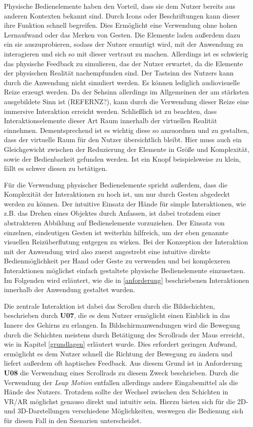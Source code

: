 Physische Bedienelemente haben den Vorteil, dass sie dem Nutzer bereits aus anderen Kontexten bekannt sind. Durch Icons oder Beschriftungen kann dieser ihre Funktion schnell begreifen. 
 Dies Ermöglicht eine Verwendung ohne hohen Lernaufwand oder das Merken von Gesten. 
Die Elemente laden außerdem dazu ein sie auszuprobieren, sodass der Nutzer ermutigt wird, mit der Anwendung zu interagieren und sich so mit dieser vertraut zu machen. 
Allerdings ist es schwierig das physische Feedback zu simulieren, das der Nutzer erwartet, da die Elemente der physischen Realität nachempfunden sind. Der Tastsinn des Nutzers kann durch die Anwendung nicht simuliert werden. Es können lediglich audiovisuelle Reize erzeugt werden. Da der Sehsinn allerdings im Allgemeinen der am stärksten ausgebildete Sinn ist (REFERNZ?), kann durch die Verwendung dieser Reize eine immersive Interaktion erreicht werden. 
Schließlich ist zu beachten, dass Interaktionselemente dieser Art Raum innerhalb der virtuellen Realität einnehmen. Dementsprechend ist es wichtig diese so anzuordnen und zu gestalten, dass der virtuelle Raum für den Nutzer übersichtlich bleibt. Hier muss auch ein Gleichgewicht zwischen der Reduzierung der Elemente in Größe und Komplexität, sowie der Bedienbarkeit gefunden werden. Ist ein Knopf beispielsweise zu klein, fällt es schwer diesen zu betätigen. 

Für die Verwendung physischer Bedienelemente spricht außerdem, dass die Komplexität der Interaktionen zu hoch ist, um nur durch Gesten abgedeckt werden zu können. Der intuitive Einsatz der Hände für simple Interaktionen, wie z.B. das Drehen eines Objektes durch Anfassen, ist dabei trotzdem einer abstrakteren Abbildung auf Bedienelemente vorzuziehen. Der Einsatz von einzelnen, eindeutigen Gesten ist weiterhin hilfreich, um der eben genannte visuellen Reizüberflutung entgegen zu wirken. 
Bei der Konzeption der Interaktion mit der Anwendung wird also zuerst angestrebt eine intuitive direkte Bedienmöglichkeit per Hand oder Geste zu verwenden und bei komplexeren Interaktionen möglichst einfach gestaltete physische Bedienelemente einzusetzen.
Im Folgenden wird erläutert, wie die in \ref{anforderung} beschriebenen Interaktionen innerhalb der Anwendung gestaltet wurden.

Die zentrale Interaktion ist dabei das Scrollen durch die Bildschichten, beschrieben durch \textbf{U07}, die es dem Nutzer ermöglicht einen Einblick in das Innere des Gehirns zu erlangen. In Bildschirmanwendungen wird die Bewegung durch die Schichten meistens durch Betätigung des Scrollrads der Maus erreicht, wie in Kapitel \ref{grundlagen} erläutert wurde.
Dies erfordert geringen Aufwand, ermöglicht es dem Nutzer schnell die Richtung der Bewegung zu ändern und liefert außerdem oft haptisches Feedback. 
Aus diesem Grund ist in Anforderung \textbf{U08} die Verwendung eines Scrollrads zu diesem Zweck beschrieben. Durch die Verwendung der \textit{Leap Motion} entfallen allerdings andere Eingabemittel als die Hände des Nutzers.
Trotzdem sollte der Wechsel zwischen den Schichten in VR/AR möglichst genauso direkt und intuitiv sein. 
Hierzu bieten sich für die 2D- und 3D-Darstellungen verschiedene Möglichkeiten, weswegen die Bedienung sich für diesen Fall in den Szenarien unterscheidet. 

